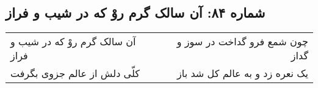 \begin{center}
\section*{شماره ۸۴: آن سالک گرم روْ که در شیب و فراز}
\label{sec:084}
\begin{longtable}{l p{0.5cm} r}
آن سالک گرم روْ که در شیب و فراز
&&
چون شمع فرو گداخت در سوز و گداز
\\
کلّی دلش از عالم جزوی بگرفت
&&
یک نعره زد و به عالم کل شد باز
\\
\end{longtable}
\end{center}
